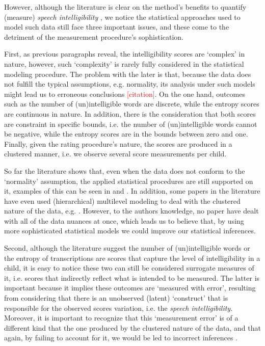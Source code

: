 However, although the literature is clear on the method's benefits to quantify (measure) \textit{speech intelligibility} \cite{Boonen_et_al_2020, Boonen_et_al_2021, Hustad_et_al_2020}, we notice the statistical approaches used to model such data still face three important issues, and these come to the detriment of the measurement procedure's sophistication. 

First, as previous paragraphs reveal, the intelligibility scores are `complex' in nature, however, such `complexity' is rarely fully considered in the statistical modeling procedure. The problem with the later is that, because the data does not fulfill the typical assumptions, e.g. normality, its analysis under such models might lead us to erroneous conclusions \textcolor{red}{[citation]}. On the one hand, outcomes such as the number of (un)intelligible words are discrete, while the entropy scores are continuous in nature. In addition, there is the consideration that both scores are constraint in specific bounds, i.e. the number of (un)intelligible words cannot be negative, while the entropy scores are in the bounds between zero and one. Finally, given the rating procedure's nature, the scores are produced in a clustered manner, i.e. we observe several score measurements per child. 

So far the literature shows that, even when the data does not conform to the `normality' assumption, the applied statistical procedures are still supported on it, examples of this can be seen in \citet{Boonen_et_al_2021, Flipsen_et_al_2006} and \citet{Hustad_et_al_2020}. In addition, some papers in the literature have even used (hierarchical) multilevel modeling to deal with the clustered nature of the data, e.g. \citet{Boonen_et_al_2021}. However, to the authors knowledge, no paper have dealt with all of the data nuances at once, which leads us to believe that, by using more sophisticated statistical models we could improve our statistical inferences. 

Second, although the literature suggest the number of (un)intelligible words or the entropy of transcriptions are scores that capture the level of intelligibility in a child, it is easy to notice these two can still be considered surrogate measures of it, i.e. scores that indirectly reflect what is intended to be measured. The latter is important because it implies these outcomes are `measured with error', resulting from considering that there is an unobserved (latent) `construct' that is responsible for the observed scores variation, i.e. the \textit{speech intelligibility}. Moreover, it is important to recognize that this `measurement error' is of a different kind that the one produced by the clustered nature of the data, and that again, by failing to account for it, we would be led to incorrect inferences \cite{deHaan_et_al_2019}.

